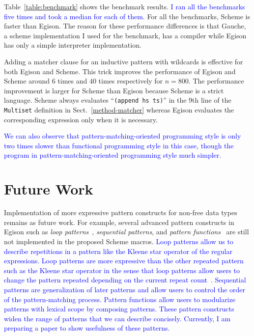\documentclass[acmlarge]{acmart}
\newcommand{\new}[1]{\textcolor{blue}{#1}}
\begin{document}
Table~\ref{table:benchmark} shows the benchmark results.
\new{
I ran all the benchmarks five times and took a median for each of them.
}%
For all the benchmarks, Scheme is faster than Egison.
The reason for these performance differences is that Gauche, a scheme implementation I used for the benchmark, has a compiler while Egison has only a simple interpreter implementation.

Adding a matcher clause for an inductive pattern with wildcards is effective for both Egison and Scheme.
This trick improves the performance of Egison and Scheme around $6$ times and $40$ times respectively for $n=800$.
The performance improvement is larger for Scheme than Egison because Scheme is a strict language.
Scheme always evaluates ``\lstinline{(append hs ts)}'' in the 9th line of the \lstinline{Multiset} definition in Sect.~\ref{method-matcher} whereas Egison evaluates the corresponding expression only when it is necessary.

\new{
We can also observe that pattern-matching-oriented programming style is only two times slower than functional programming style in this case, though the program in pattern-matching-oriented programming style much simpler.
}%

\section{Future Work}\label{future}

Implementation of more expressive pattern constructs for non-free data types remains as future work.
For example, several advanced pattern constructs in Egison such as \emph{loop patterns}~\cite{egi2018loop}, \emph{sequential patterns}, and \emph{pattern functions}~\cite{egisonPat} are still not implemented in the proposed Scheme macros.
\new{
Loop patterns allow us to describe repetitions in a pattern like the Kleene star operator of the regular expressions.
Loop patterns are more expressive than the other repeated pattern such as the Kleene star operator in the sense that loop patterns allow users to change the pattern repeated depending on the current repeat count~\cite{egi2018loop}.
Sequential patterns are generalization of later patterns and  allow users to control the order of the pattern-matching process.
Pattern functions allow users to modularize patterns with lexical scope by composing patterns.
These pattern constructs widen the range of patterns that we can describe concisely.
Currently, I am preparing a paper to show usefulness of these patterns.
}%
\end{document}
